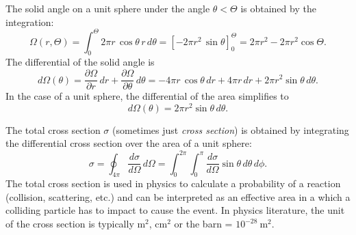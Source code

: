 \documentclass[a4paper,11pt,titlepage,twoside]{book}
\newcommand{\unit}[2]{$#1~\ensuremath{\mathrm{#2}}$}
\begin{document}
The solid angle on a unit sphere under the angle $\theta < \Theta$ is obtained by the integration:
\begin{equation}
  \Omega\left(r, \Theta\right) = \int_0^\Theta 2\pi r\,\cos\theta\,r\,d\theta = \left[-2\pi r^2\,\sin\theta\right]_0^\Theta = 2\pi r^2 - 2\pi r^2\cos\Theta.
\end{equation}
The differential of the solid angle is
\begin{equation}
  d\Omega\left(\theta\right) = \frac{\partial \Omega}{\partial r}\,dr + \frac{\partial \Omega}{\partial \theta}\,d\theta = -4\pi r\,\cos\theta\,dr + 4\pi r\,dr + 2\pi r^2\sin\theta\,d\theta.
\end{equation}
In the case of a unit sphere, the differential of the area simplifies to
\begin{equation}
  d\Omega(\theta) = 2\pi r^2\sin\theta\,d\theta.
\end{equation}

The total cross section $\sigma$ (sometimes just \emph{cross section}) is obtained by integrating the differential cross section over the area of a unit sphere:
\begin{equation}
  \sigma = \oint_{4\pi} \frac{d\sigma}{d\Omega}\,d\Omega = \int_0^{2\pi} \int_0^{\pi} \frac{d\sigma}{d\Omega}\sin\theta\,d\theta\,d\phi.
\end{equation}
The total cross section is used in physics to calculate a probability of a reaction (collision, scattering, etc.) and can be interpreted as an effective area in a which a colliding particle has to impact to cause the event.
In physics literature, the unit of the cross section is typically $\mathrm{m}^2$, $\mathrm{cm}^2$ or the barn = \unit{10^{-28}}{m^2}.
\end{document}
